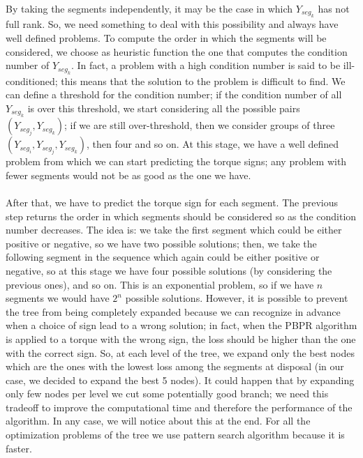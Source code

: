 \documentclass{article}
\begin{document}
By taking the segments independently, it may be the case in which $Y_{seg_k}$ has not full rank. So, we need something to deal with this possibility and always have well defined problems. To compute the order in which the segments will be considered, we choose as heuristic function  the one that computes the condition number of $Y_{seg_k}$. In fact, a problem with a high condition number is said to be ill-conditioned; this means that the solution to the problem is difficult to find. We can define a threshold for the condition number; if the condition number of all $Y_{seg_k}$ is over this threshold, we start considering all the possible pairs $(Y_{seg_j},Y_{seg_k})$; if we are still over-threshold, then we consider groups of three $(Y_{seg_i},Y_{seg_j},Y_{seg_k})$, then four and so on. At this stage, we have a well defined problem from which we can start predicting the torque signs; any problem with fewer segments would not be as good as the one we have.

\paragraph{}After that, we have to predict the torque sign for each segment. The previous step returns the order in which segments should be considered so as the condition number decreases. The idea is: we take the first segment which could be either positive or negative, so we have two possible solutions; then, we take the following segment in the sequence which again could be either positive or negative, so at this stage we have four possible solutions (by considering the previous ones), and so on. This is an exponential problem, so if we have $n$ segments we would have $2^n$ possible solutions. However, it is possible to prevent the tree from being completely expanded because we can recognize in advance when a choice of sign lead to a wrong solution; in fact, when the PBPR algorithm is applied to a torque with the wrong sign, the loss should be higher than the one with the correct sign. So, at each level of the tree, we expand only the best nodes which are the ones with the lowest loss among the segments at disposal (in our case, we decided to expand the best 5 nodes).  It could happen that by expanding only few nodes per level we cut some potentially good branch; we need this tradeoff to improve the computational time and therefore the performance of the algorithm. In any case, we will notice about this at the end. For all the optimization problems of the tree we use pattern search algorithm because it is faster.
\end{document}
